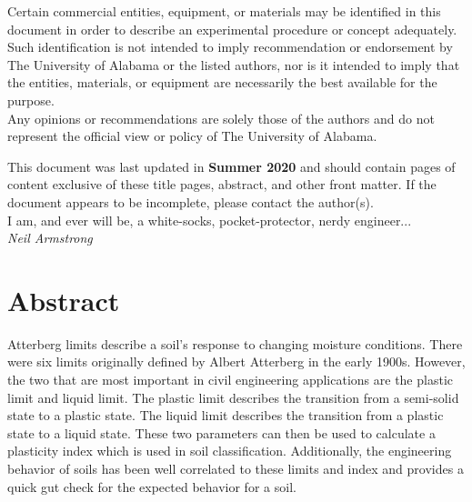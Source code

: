 \documentclass[12pt]{article}
\newcommand{\LastUpdate}{Summer 2020}
\begin{document}
\begin{titlepage}
\begin{center}
\normalsize 
Certain commercial entities, equipment, or materials may be identified in this document in order to describe an experimental procedure or concept adequately. Such identification is not intended to imply recommendation or endorsement by The University of Alabama or the listed authors, nor is it intended to imply that the entities, materials, or equipment are necessarily the best available for the purpose.\\

\vfill
Any opinions or recommendations are solely those of the authors and do not represent the official view or policy of The University of Alabama.
\end{center}
\begin{flushright}
\vfill
\normalsize 
This document was last updated in \textbf{\LastUpdate} and should contain \textbf{\pageref{LastPage}} pages of content exclusive of these title pages, abstract, and other front matter. If the document appears to be incomplete, please contact the author(s).\\
\vfill
I am, and ever will be, a white-socks, pocket-protector, nerdy engineer...\\
\textit{Neil Armstrong}
\end{flushright}
\end{titlepage}
\section*{Abstract}
\normalsize Atterberg limits describe a soil's response to changing moisture conditions. There were six limits originally defined by Albert Atterberg in the early 1900s. However, the two that are most important in civil engineering applications are the plastic limit and liquid limit. The plastic limit describes the transition from a semi-solid state to a plastic state. The liquid limit describes the transition from a plastic state to a liquid state. These two parameters can then be used to calculate a plasticity index which is used in soil classification. Additionally, the engineering behavior of soils has been well correlated to these limits and index and provides a quick gut check for the expected behavior for a soil.\\
\end{document}
